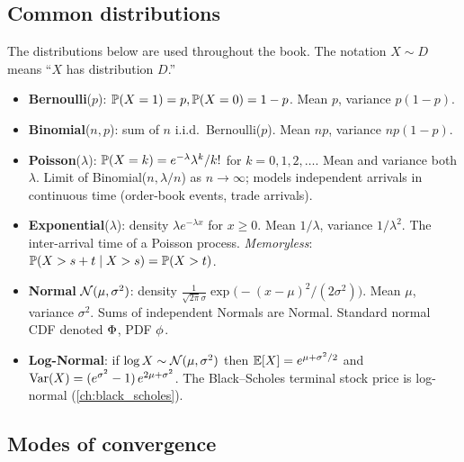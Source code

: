\subsection{Common distributions}

The distributions below are used throughout the book. The notation
$X \sim D$ means ``$X$ has distribution $D$.''

\begin{keyfactbox}
\begin{itemize}
  \item \textbf{Bernoulli}($p$): $\mathbb{P}(X=1)=p, \mathbb{P}(X=0)=1-p$.
        Mean $p$, variance $p(1-p)$.
  \item \textbf{Binomial}($n,p$): sum of $n$ i.i.d.\ Bernoulli($p$).
        Mean $np$, variance $np(1-p)$.
  \item \textbf{Poisson}($\lambda$): $\mathbb{P}(X=k)=e^{-\lambda}\lambda^k/k!$
        for $k=0,1,2,\dots$. Mean and variance both $\lambda$. Limit of
        Binomial($n, \lambda/n$) as $n\to\infty$; models independent
        arrivals in continuous time (order-book events, trade arrivals).
  \item \textbf{Exponential}($\lambda$): density $\lambda e^{-\lambda x}$
        for $x\ge 0$. Mean $1/\lambda$, variance $1/\lambda^2$. The
        inter-arrival time of a Poisson process. \emph{Memoryless}:
        $\mathbb{P}(X > s+t \mid X > s) = \mathbb{P}(X > t)$.
  \item \textbf{Normal} $\mathcal{N}(\mu, \sigma^2)$: density
        $\frac{1}{\sqrt{2\pi}\sigma} \exp\!\big(-(x-\mu)^2/(2\sigma^2)\big)$.
        Mean $\mu$, variance $\sigma^2$. Sums of independent Normals are
        Normal. Standard normal CDF denoted $\Phi$, PDF $\phi$.
  \item \textbf{Log-Normal}: if $\log X \sim \mathcal{N}(\mu,\sigma^2)$ then
        $\mathbb{E}[X] = e^{\mu + \sigma^2/2}$ and
        $\operatorname{Var}(X) = (e^{\sigma^2}-1)\,e^{2\mu + \sigma^2}$.
        The Black--Scholes terminal stock price is log-normal
        (\cref{ch:black_scholes}).
\end{itemize}
\end{keyfactbox}

\subsection{Modes of convergence}


